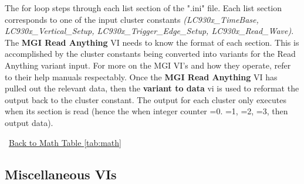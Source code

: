 \documentclass[11pt,a4paper,oldfontcommands]{memoir}
\begin{document}
The for loop steps through each list section of the ".ini" file. Each list section corresponds to one of the input cluster constants \textit{(LC930x\_TimeBase, LC930x\_Vertical\_Setup, LC930x\_Trigger\_Edge\_Setup, LC930x\_Read\_Wave)}. The \textbf{MGI Read Anything} VI needs to know the format of each section. This is accomplished by the cluster constants being converted into variants for the Read Anything variant input.  For more on the MGI VI's and how they operate, refer to their help manuals respectably. Once the \textbf{MGI Read Anything} VI has pulled out the relevant data, then the \textbf{variant to data} vi is used to reformat the output back to the cluster constant. The output for each cluster only executes when its section is read (hence the when integer counter =0. =1, =2, =3, then output data).

\noindent\hrulefill\, \hyperref[tab:math]{Back to Math Table \ref{tab:math}}

\newpage

\subsection{Miscellaneous VIs}
\end{document}

